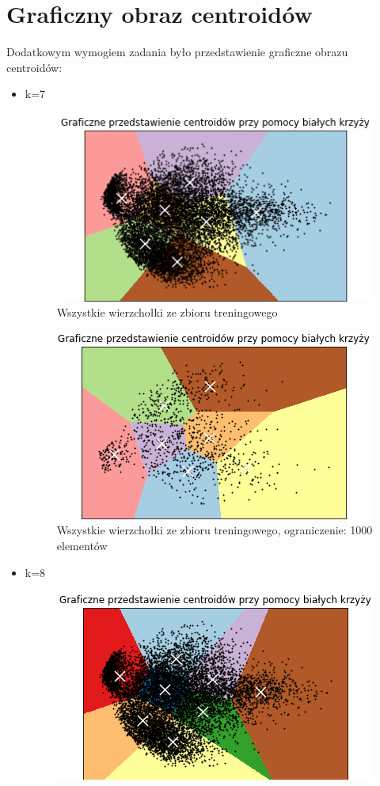 \documentclass[a4paper,14pt]{report}
\begin{document}
\section{Graficzny obraz centroidów}
	Dodatkowym wymogiem zadania było przedstawienie graficzne obrazu centroidów:
	\begin{itemize}
		\item k=7 
		\begin{figure}[H]
	      \includegraphics[scale=1.0]{k7}
	      \centering
	      \caption{Wszystkie wierzchołki ze zbioru treningowego}
	    \end{figure}
	    \begin{figure}[H]
	      \includegraphics[scale=1.0]{k71000}
	      \centering
	      \caption{Wszystkie wierzchołki ze zbioru treningowego, ograniczenie: 1000 elementów}
	    \end{figure}
	    \item k=8 
		\begin{figure}[H]
	      \includegraphics[scale=1.0]{k8}

\end{figure}
\end{itemize}
\end{document}
